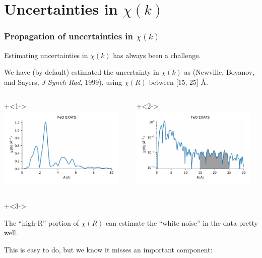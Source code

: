 \section{Uncertainties in $\chi(k)$}
\begin{frame}\frametitle{Propagation of uncertainties in $\chi(k)$}

\begin{cenpage}{95mm}

  Estimating uncertainties in  $\chi(k)$ has always been a challenge.

  \vmm

  We have (by default) estimated the uncertainty in $\chi(k)$ as
  {} {\tiny{(Newville, Boyanov, and Sayers, {\emph{J
          Synch Rad}}, 1999)}}, using $\chi(R)$ between [15, 25] \AA.

\end{cenpage}

\begin{columns}
  \begin{column}[T]{60mm}

    {\onslide+<1->  \includegraphics[width=60mm]{figs/errors/feo_chir}  }


  \end{column}
  \begin{column}[T]{60mm}

    {\onslide+<2-> \includegraphics[width=60mm]{figs/errors/feo_chir_logscale} }

  \end{column}
\end{columns}

{\onslide+<3->

  \begin{cenpage}{105mm}


    The ``high-R'' portion of $\chi(R)$ can estimate the
    ``white noise'' in the data pretty well.

    \vmm
    This is easy to do, but we know it misses an important component:
  \end{cenpage}


  \begin{postitbox}{53mm}
  \end{postitbox}

}

\end{frame}


